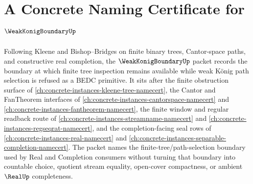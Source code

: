 \chapter{A Concrete Naming Certificate for $\WeakKonigBoundaryUp$}
\label{ch:concrete-instances-weak-konig-boundary-namecert}

Following Kleene and Bishop--Bridges on finite binary trees, Cantor-space paths, and constructive real completion, the $\WeakKonigBoundaryUp$ packet records the boundary at which finite tree inspection remains available while weak König path selection is refused as a BEDC primitive. It sits after the finite obstruction surface of \autoref{ch:concrete-instances-kleene-tree-namecert}, the Cantor and FanTheorem interfaces of \autoref{ch:concrete-instances-cantorspace-namecert} and \autoref{ch:concrete-instances-fantheorem-namecert}, the finite window and regular readback route of \autoref{ch:concrete-instances-streamname-namecert} and \autoref{ch:concrete-instances-regseqrat-namecert}, and the completion-facing seal rows of \autoref{ch:concrete-instances-real-namecert} and \autoref{ch:concrete-instances-separable-completion-namecert}. The packet names the finite-tree/path-selection boundary used by Real and Completion consumers without turning that boundary into countable choice, quotient stream equality, open-cover compactness, or ambient $\RealUp$ completeness.

